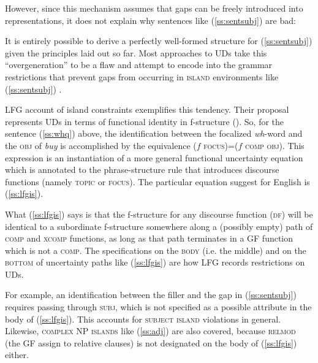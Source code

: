 \documentclass[output=paper,hidelinks]{langscibook}
\begin{document}
However, since this mechanism assumes that gaps can be freely introduced into representations, it does not explain why sentences like (\ref{ss:sentsubj}) are bad:




\begin{exe}
\label{ss:sentsubj}
\end{exe}


 \largerpage
It is entirely possible to derive a perfectly well-formed structure for (\ref{ss:sentsubj}) given the principles laid out so far. Most approaches to UDs take this ``overgeneration'' to be a flaw and attempt to encode into the grammar restrictions that prevent gaps from occurring in \textsc{island} environments like (\ref{ss:sentsubj}) \citep{ross1967constraints}.

 LFG account of island constraints exemplifies this tendency. Their proposal represents UDs in terms of functional identity in f-structure (). So, for the sentence (\ref{ss:whq}) above, the identification between the focalized \textit{wh}-word and the \textsc{obj} of \textit{buy} is accomplished by the equivalence ($f$ \textsc{focus})=($f$ \textsc{comp obj}). This expression is an instantiation of a more general functional uncertainty equation which is annotated to the phrase-structure rule that introduces discourse functions (namely \textsc{topic} or \textsc{focus}). The particular equation \citet[153]{kaplzaen89} suggest for English is (\ref{ss:lfgis}).

\begin{exe}
 \label{ss:lfgis}
\end{exe}


What (\ref{ss:lfgis}) says is that the f-structure for any discourse function (\textsc{df}) will be identical to a subordinate f-structure somewhere along a (possibly empty) path of \textsc{comp} and \textsc{xcomp} functions, as long as that path terminates in a GF function which is not a \textsc{comp}. The specifications on the \textsc{body} (i.e. the middle) and on the \textsc{bottom} of uncertainty paths like (\ref{ss:lfgis}) are how LFG records restrictions on UDs.


For example, an identification between the filler and the gap in (\ref{ss:sentsubj}) requires passing through \textsc{subj}, which is not specified as a possible attribute in the body of (\ref{ss:lfgis}). This accounts for \textsc{subject island} violations in general. Likewise, \textsc{complex NP islands} like (\ref{ss:adj}) are also covered, because \textsc{relmod} (the GF \citet{kaplzaen89} assign to relative clauses) is not designated on the body of (\ref{ss:lfgis}) either.  %
\end{document}
